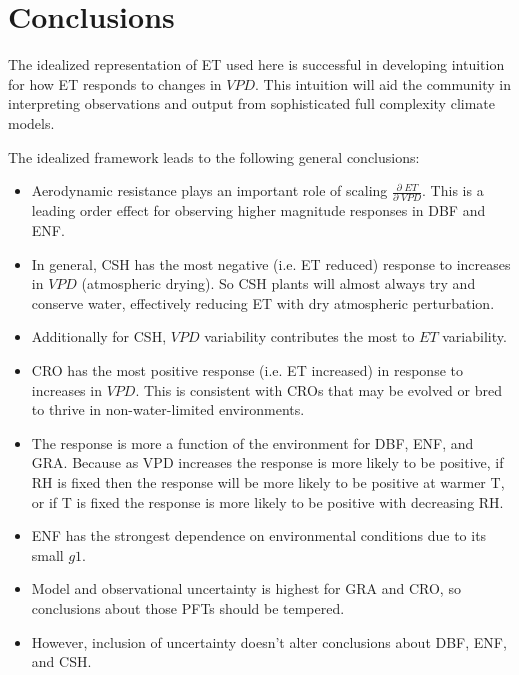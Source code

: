 \documentclass[draft,linenumbers]{agujournal}
\begin{document}


\section{Conclusions} 

The idealized representation of ET used here is successful in developing intuition for how ET responds to changes in $VPD$. This intuition will aid the community in interpreting observations and output from sophisticated full complexity climate models.

The idealized framework leads to the following general conclusions:
\begin{itemize}
  \item Aerodynamic resistance plays an important role of scaling $\frac{\partial \; ET}{\partial \; VPD}$. This is a leading order effect for observing higher magnitude responses in DBF and ENF.
  \item In general, CSH has the most negative (i.e. ET reduced) response to increases in $VPD$ (atmospheric drying). So CSH plants will almost always try and conserve water, effectively reducing ET with dry atmospheric perturbation.
    \item Additionally for CSH, $VPD$ variability contributes the most to $ET$ variability.
\item CRO has the most positive response (i.e. ET increased) in response to increases in $VPD$. This is consistent with CROs that may be evolved or bred to thrive in non-water-limited environments.
\item The response is more a function of the environment for DBF, ENF, and GRA. Because as VPD increases the response is more likely to be positive, if RH is fixed then the response will be more likely to be positive at warmer T, or if T is fixed the response is more likely to be positive with decreasing RH.
\item ENF has the strongest dependence on environmental conditions due to its small $g1$.
\item Model and observational uncertainty is highest for GRA and CRO, so conclusions about those PFTs should be tempered.
\item However, inclusion of uncertainty doesn't alter conclusions about DBF, ENF, and CSH.
\end{itemize}
\end{document}
